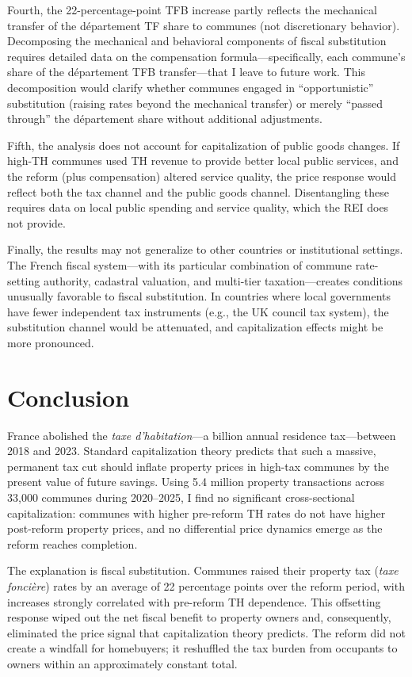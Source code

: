 \documentclass[12pt]{article}
\begin{document}
Fourth, the 22-percentage-point TFB increase partly reflects the mechanical transfer of the d\'epartement TF share to communes (not discretionary behavior). Decomposing the mechanical and behavioral components of fiscal substitution requires detailed data on the compensation formula---specifically, each commune's share of the d\'epartement TFB transfer---that I leave to future work. This decomposition would clarify whether communes engaged in ``opportunistic'' substitution (raising rates beyond the mechanical transfer) or merely ``passed through'' the d\'epartement share without additional adjustments.

Fifth, the analysis does not account for capitalization of public goods changes. If high-TH communes used TH revenue to provide better local public services, and the reform (plus compensation) altered service quality, the price response would reflect both the tax channel and the public goods channel. Disentangling these requires data on local public spending and service quality, which the REI does not provide.

Finally, the results may not generalize to other countries or institutional settings. The French fiscal system---with its particular combination of commune rate-setting authority, cadastral valuation, and multi-tier taxation---creates conditions unusually favorable to fiscal substitution. In countries where local governments have fewer independent tax instruments (e.g., the UK council tax system), the substitution channel would be attenuated, and capitalization effects might be more pronounced.


\section{Conclusion}

France abolished the \emph{taxe d'habitation}---a  billion annual residence tax---between 2018 and 2023. Standard capitalization theory predicts that such a massive, permanent tax cut should inflate property prices in high-tax communes by the present value of future savings. Using 5.4 million property transactions across 33,000 communes during 2020--2025, I find no significant cross-sectional capitalization: communes with higher pre-reform TH rates do not have higher post-reform property prices, and no differential price dynamics emerge as the reform reaches completion.

The explanation is fiscal substitution. Communes raised their property tax (\emph{taxe fonci\`ere}) rates by an average of 22 percentage points over the reform period, with increases strongly correlated with pre-reform TH dependence. This offsetting response wiped out the net fiscal benefit to property owners and, consequently, eliminated the price signal that capitalization theory predicts. The reform did not create a windfall for homebuyers; it reshuffled the tax burden from occupants to owners within an approximately constant total.
\end{document}
